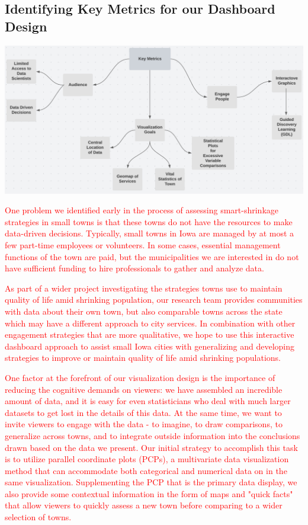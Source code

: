 \documentclass[letterpaper,inpress]{jdsart}
\begin{document}
\subsection{Identifying Key Metrics for our Dashboard Design}

\begin{center}
\includegraphics[width=.5\textwidth]{Key_Metrics}
\end{center}

{\textcolor{red}{One problem we identified early in the process of assessing smart-shrinkage strategies in small towns is that these towns do not have the resources to make data-driven decisions. Typically, small towns in Iowa are managed by at most a few part-time employees or volunteers. In some cases, essential management functions of the town are paid, but the municipalities we are interested in do not have sufficient funding to hire professionals to gather and analyze data.}}

{\textcolor{red}{As part of a wider project investigating the strategies towns use to maintain quality of life amid shrinking population, our research team provides communities with data about their own town, but also comparable towns across the state which may have a different approach to city services. In combination with other engagement strategies that are more qualitative, we hope to use this interactive dashboard approach to assist small Iowa cities with generalizing and developing strategies to improve or maintain quality of life amid shrinking populations.}}

{\textcolor{red}{One factor at the forefront of our visualization design is the importance of reducing the cognitive demands on viewers: we have assembled an incredible amount of data, and it is easy for even statisticians who deal with much larger datasets to get lost in the details of this data. At the same time, we want to invite viewers to engage with the data - to imagine, to draw comparisons, to generalize across towns, and to integrate outside information into the conclusions drawn based on the data we present.}}
{\textcolor{red}{Our initial strategy to accomplish this task is to utilize parallel coordinate plots (PCPs), a multivariate data visualization method that can accommodate both categorical and numerical data on in the same visualization. Supplementing the PCP that is the primary data display, we also provide some contextual information in the form of maps and "quick facts" that allow viewers to quickly assess a new town before comparing to a wider selection of towns.}}
\end{document}
